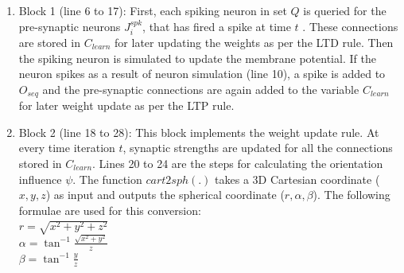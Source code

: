 \begin{enumerate}
	\item Block 1 (line 6 to 17): First, each spiking neuron in set $Q$ is queried for the pre-synaptic neurons $J_i^{spk}$, that has fired a spike at time $t$ . These connections are stored in $C_{learn}$ for later updating the weights as per the LTD rule. Then the spiking neuron is simulated to update the membrane potential. If the neuron spikes as a result of neuron simulation (line 10), a spike is added to $O_{seq}$ and the pre-synaptic connections are again added to the variable $C_{learn}$ for later weight update as per the LTP rule.
	\item Block 2 (line 18 to 28): This block implements the weight update rule. At every time iteration $t$, synaptic strengths are updated for all the connections stored in $C_{learn}$. Lines 20 to 24 are the steps for calculating the orientation influence $\psi$. The function $cart2sph(.)$ takes a 3D Cartesian coordinate ($x, y, z$) as input and outputs the spherical coordinate ($r,\alpha, \beta$). The following formulae are used for this conversion:\\
	$\displaystyle r=\sqrt{x^2+y^2+z^2}$\\ $\alpha=\tan^{-1} \frac{\sqrt{x^2+y^2}}{z}$\\$\beta=\tan^{-1}\frac{y}{z}$\\

\end{enumerate}
